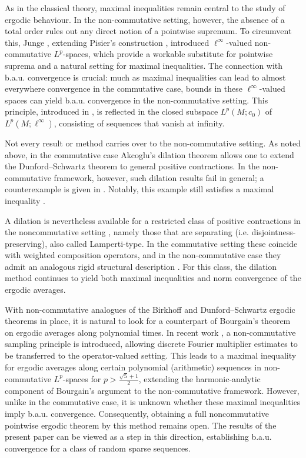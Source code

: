 \documentclass[12pt]{amsart}
\theoremstyle{remark}
\theoremstyle{definition}
\numberwithin{equation}{section}
\begin{document}
As in the classical theory, maximal inequalities remain central to the study of ergodic behaviour. In the non-commutative setting, however, the absence of a total order rules out any direct notion of a pointwise supremum. To circumvent this, Junge \cite{Ju}, extending Pisier’s construction \cite{P2}, introduced $\ell^\infty$-valued non-commutative $L^p$-spaces, which provide a workable substitute for pointwise suprema and a natural setting for maximal inequalities. The connection with b.a.u. convergence is crucial: much as maximal inequalities can lead to almost everywhere convergence in the commutative case, bounds in these $\ell^\infty$-valued spaces can yield b.a.u. convergence in the non-commutative setting. This principle, introduced in \cite{JX}, is reflected in the closed subspace \(L^p(M;c_0)\) of \(L^p(M;\ell^\infty)\), consisting of sequences that vanish at infinity.
\smallskip

Not every result or method carries over to the non-commutative setting. As noted above, in the commutative case Akcoglu’s dilation theorem allows one to extend the Dunford--Schwartz theorem to general positive contractions. In the non-commutative framework, however, such dilation results fail in general; a counterexample is given in \cite{JLM}. Notably, this example still satisfies a maximal inequality \cite[7.2]{HRW}. 
\smallskip

A dilation is nevertheless available for a restricted class of positive contractions in the noncommutative setting \cite{HRW}, namely those that are separating (i.e. disjointness-preserving), also called Lamperti-type. In the commutative setting these coincide with weighted composition operators, and in the non-commutative case they admit an analogous rigid structural description \cite{HRW,LMZ}. For this class, the dilation method continues to yield both maximal inequalities and norm convergence of the ergodic averages.
\smallskip

With non-commutative analogues of the Birkhoff and Dunford--Schwartz ergodic theorems in place, it is natural to look for a counterpart of Bourgain’s theorem on ergodic averages along polynomial times. In recent work \cite{CHW}, a non-commutative sampling principle is introduced, allowing discrete Fourier multiplier estimates to be transferred to the operator-valued setting. This leads to a maximal inequality for ergodic averages along certain polynomial (arithmetic) sequences in non-commutative \(L^p\)-spaces for \(p > \frac{\sqrt{5}+1}{2}\), extending the harmonic-analytic component of Bourgain’s argument \cite{B7} to the non-commutative framework. However, unlike in the commutative case, it is unknown whether these maximal inequalities imply b.a.u. convergence. Consequently, obtaining a full noncommutative pointwise ergodic theorem by this method remains open. The results of the present paper can be viewed as a step in this direction, establishing b.a.u. convergence for a class of random sparse sequences.
\smallskip
\end{document}

